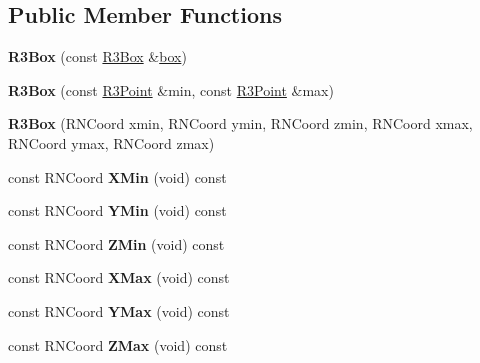 \subsection*{Public Member Functions}
\begin{DoxyCompactItemize}
\item 
{\bfseries R3\+Box} (const \hyperlink{class_r3_box}{R3\+Box} \&\hyperlink{structbox}{box})\hypertarget{class_r3_box_a612a8e476d95818c33face7502e2decf}{}\label{class_r3_box_a612a8e476d95818c33face7502e2decf}

\item 
{\bfseries R3\+Box} (const \hyperlink{class_r3_point}{R3\+Point} \&min, const \hyperlink{class_r3_point}{R3\+Point} \&max)\hypertarget{class_r3_box_acf6fa8a44ef5e89d6d3c036ed30b8cf8}{}\label{class_r3_box_acf6fa8a44ef5e89d6d3c036ed30b8cf8}

\item 
{\bfseries R3\+Box} (R\+N\+Coord xmin, R\+N\+Coord ymin, R\+N\+Coord zmin, R\+N\+Coord xmax, R\+N\+Coord ymax, R\+N\+Coord zmax)\hypertarget{class_r3_box_a0f8f2d3ad4745058c22764cedbd8cf47}{}\label{class_r3_box_a0f8f2d3ad4745058c22764cedbd8cf47}

\item 
const R\+N\+Coord {\bfseries X\+Min} (void) const \hypertarget{class_r3_box_ab0bfdca027902805aab8ef82dfaaf241}{}\label{class_r3_box_ab0bfdca027902805aab8ef82dfaaf241}

\item 
const R\+N\+Coord {\bfseries Y\+Min} (void) const \hypertarget{class_r3_box_ac104b65e94ac2099556fe4336da197a2}{}\label{class_r3_box_ac104b65e94ac2099556fe4336da197a2}

\item 
const R\+N\+Coord {\bfseries Z\+Min} (void) const \hypertarget{class_r3_box_afbc351c2f36e60cc7f43d674bab10fb0}{}\label{class_r3_box_afbc351c2f36e60cc7f43d674bab10fb0}

\item 
const R\+N\+Coord {\bfseries X\+Max} (void) const \hypertarget{class_r3_box_a01963da986d89fbbf6bab0239c7a6d13}{}\label{class_r3_box_a01963da986d89fbbf6bab0239c7a6d13}

\item 
const R\+N\+Coord {\bfseries Y\+Max} (void) const \hypertarget{class_r3_box_a663e215b8d254c29271c1e910aaae4cc}{}\label{class_r3_box_a663e215b8d254c29271c1e910aaae4cc}

\item 
const R\+N\+Coord {\bfseries Z\+Max} (void) const \hypertarget{class_r3_box_a15c550c15997bbacdd9f91b27125600e}{}\label{class_r3_box_a15c550c15997bbacdd9f91b27125600e}


\end{DoxyCompactItemize}
